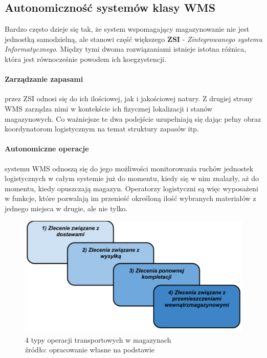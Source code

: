 	\subsection{Autonomiczność systemów klasy WMS}
		Bardzo często dzieje się tak, że system wspomagający magazynowanie nie jest jednostką samodzielną, ale 
		stanowi część większego \textbf{ZSI} - \textit{Zintegrowanego systemu Informatycznego}. Między tymi
		dwoma rozwiązaniami istnieje istotna różnica, która jest równocześnie powodem ich koegzystencji.
			\paragraph{Zarządzanie zapasami} przez ZSI odnosi się do ich ilościowej, jak i jakościowej natury. Z
			drugiej strony WMS zarządza nimi w kontekście ich fizycznej lokalizacji i stanów magazynowych. Co
			ważniejsze te dwa podejście uzupełniają się dając pełny obraz koordynatorom logistycznym na temat
			struktury zapasów itp. 
			\paragraph{Autonomiczne operacje} systemu WMS odnoszą się do jego możliwości monitorowania ruchów
			jednostek logistycznych w całym systemie już do momentu, kiedy się w nim znalazły, aż do momentu,
			kiedy opuszczają magazyn. Operatorzy logistyczni są więc wypo\-sażeni w funkcje, które pozwalają
			im przenieść określoną ilość wybranych materiałów z jednego miejsca w drugie, ale nie tylko.
			\begin{figure}[H]
				\centering
				\includegraphics[width=\textwidth]{images/transport_ops}
				\caption[Operacja transportowe w magazynach]{
					4 typy operacji transportowych w magazynach\\
					źródło: opracowanie własne na podstawie \cite{IDL}
				}
			\end{figure}